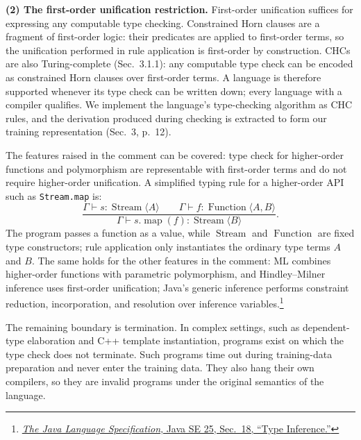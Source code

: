 \documentclass[11pt,a4paper]{article}
\begin{document}
\textbf{(2) The first-order unification restriction.}
First-order unification suffices for expressing any computable type checking. Constrained Horn clauses are a fragment of first-order logic: their predicates are applied to first-order terms, so the unification performed in rule application is first-order by construction. CHCs are also Turing-complete (Sec.~3.1.1): any computable type check can be encoded as constrained Horn clauses over first-order terms. A language is therefore supported whenever its type check can be written down; every language with a compiler qualifies. We implement the language's type-checking algorithm as CHC rules, and the derivation produced during checking is extracted to form our training representation (Sec.~3, p.~12).

The features raised in the comment can be covered: type check for higher-order functions and polymorphism are representable with first-order terms and do not require higher-order unification. A simplified typing rule for a higher-order API such as \texttt{Stream.map} is:
\[
\frac{\Gamma \vdash s : \operatorname{Stream}\langle A\rangle
      \qquad
      \Gamma \vdash f : \operatorname{Function}\langle A,B\rangle}
     {\Gamma \vdash s.\operatorname{map}(f) : \operatorname{Stream}\langle B\rangle}.
\]
The program passes a function as a value, while $\operatorname{Stream}$ and $\operatorname{Function}$ are fixed type constructors; rule application only instantiates the ordinary type terms $A$ and $B$. The same holds for the other features in the comment: ML combines higher-order functions with parametric polymorphism, and Hindley--Milner inference uses first-order unification; Java's generic inference performs constraint reduction, incorporation, and resolution over inference variables.\footnote{\href{https://docs.oracle.com/javase/specs/jls/se25/html/jls-18.html}{\emph{The Java Language Specification}, Java SE 25, Sec.~18, ``Type Inference.''}}

The remaining boundary is termination. In complex settings, such as dependent-type elaboration and C++ template instantiation, programs exist on which the type check does not terminate. Such programs time out during training-data preparation and never enter the training data. They also hang their own compilers, so they are invalid programs under the original semantics of the language.
\end{document}
